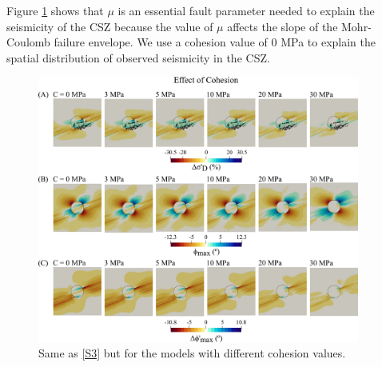 \documentclass[draft,jgrga]{agutexSI2019}
\begin{document}
\begin{article}
Figure \ref{S6} shows that $\mu$ is an essential fault parameter needed to explain the seismicity of the CSZ because the value of $\mu$ affects the slope of the Mohr-Coulomb failure envelope. We use a cohesion value of 0 MPa to explain the spatial distribution of observed seismicity in the CSZ. 

\vspace{10mm} %

\begin{figure}[ht]
\includegraphics[width=25pc]{Figures/SD70R25C_S2.png}
\caption{Same as \ref{S3} but for the models with different cohesion values.}
\label{S6}
\end{figure}

\vspace{10mm} %


\pagebreak






















\end{article}
\end{document}
